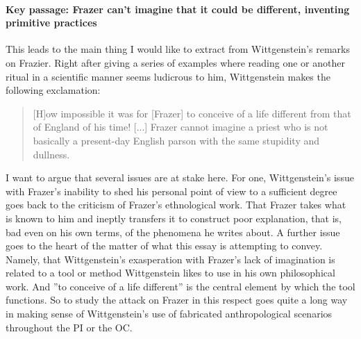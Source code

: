 \documentclass{article}
\begin{document}
\paragraph{Key passage: Frazer can't imagine that it could be different, inventing primitive practices}
This leads to the main thing I would like to extract from Wittgenstein's remarks on Frazier. Right after giving a series of examples where reading one or another ritual  in a scientific manner seems ludicrous to him, Wittgenstein makes the following exclamation:
\begin{quote}
[H]ow impossible it was for [Frazer] to conceive of a life different from that of England of his time! [...] Frazer cannot imagine a priest who is not basically a present-day English parson with the same stupidity and dullness.
\end{quote}
I want to argue that several issues are at stake here. For one, Wittgenstein's issue with Frazer's inability to shed his personal point of view to a sufficient degree goes back to the criticism of Frazer's ethnological work. That Frazer takes what is known to him and ineptly transfers it to construct poor explanation, that is, bad even on his own terms, of the phenomena he writes about. A further issue goes to the heart of the matter of what this essay is attempting to convey. Namely, that Wittgenstein's exasperation with Frazer's lack of imagination is related to a tool or method Wittgenstein likes to use in his own philosophical work. And ''to conceive of a life different'' is the central element by which the tool functions. So to study the attack on Frazer in this respect goes quite a long way in making sense of Wittgenstein's use of fabricated anthropological scenarios throughout the PI or the OC. 
 
\end{document}
